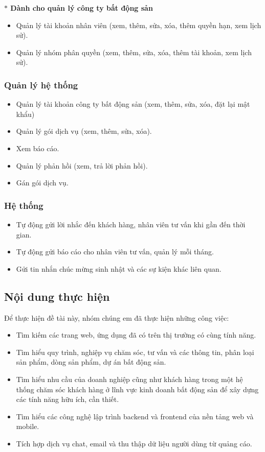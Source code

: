 \documentclass[12pt,a4paper]{article}
\begin{document}
    \textbf{$\ast$ Dành cho quản lý công ty bất động sản}
    \begin{itemize}
        \item Quản lý tài khoản nhân viên (xem, thêm, sửa, xóa, thêm quyền hạn, xem lịch sử).
        \item Quản lý nhóm phân quyền (xem, thêm, sửa, xóa, thêm tài khoản, xem lịch sử).
    \end{itemize}

    \subsubsection*{Quản lý hệ thống}
    \begin{itemize}
        \item Quản lý tài khoản công ty bất động sản (xem, thêm, sửa, xóa, đặt lại mật khẩu)
        \item Quản lý gói dịch vụ (xem, thêm, sửa, xóa).
        \item Xem báo cáo.
        \item Quản lý phản hồi (xem, trả lời phản hồi).
        \item Gán gói dịch vụ.
    \end{itemize}

    \subsubsection*{Hệ thống}
    \begin{itemize}
        \item Tự động gửi lời nhắc đến khách hàng, nhân viên tư vấn khi gần đến thời gian.
        \item Tự động gửi báo cáo cho nhân viên tư vấn, quản lý mỗi tháng.
        \item Gửi tin nhắn chúc mừng sinh nhật và các sự kiện khác liên quan.
    \end{itemize}

    \subsection*{Nội dung thực hiện}
    Để thực hiện đề tài này, nhóm chúng em đã thực hiện những công việc:
    \begin{itemize}
        \item Tìm kiếm các trang web, ứng dụng đã có trên thị trường có cùng tính năng.
        \item Tìm hiểu quy trình, nghiệp vụ chăm sóc, tư vấn và các thông tin, phân loại sản phẩm, dòng sản phẩm, dự án bất động sản.
        \item Tìm hiểu nhu cầu của doanh nghiệp cũng như khách hàng trong một hệ thống chăm sóc khách hàng ở lĩnh vực kinh doanh bất động sản để xây dựng các tính năng hữu ích, cần thiết.
        \item Tìm hiểu các công nghệ lập trình backend và frontend của nền tảng web và mobile.
        \item Tích hợp dịch vụ chat, email và thu thập dữ liệu người dùng từ quảng cáo.
    \end{itemize}
\end{document}
